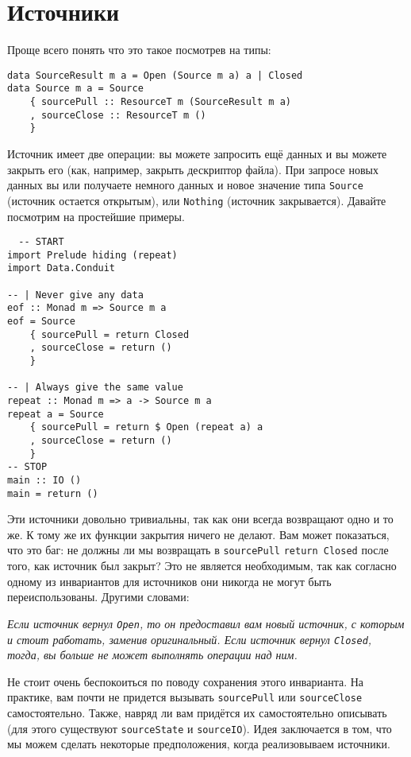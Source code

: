 \section{Источники}

Проще всего понять что это такое посмотрев на типы:
\begin{lstlisting}
data SourceResult m a = Open (Source m a) a | Closed
data Source m a = Source
    { sourcePull :: ResourceT m (SourceResult m a)
    , sourceClose :: ResourceT m ()
    }
\end{lstlisting}
Источник имеет две операции: вы можете запросить ещё данных и вы можете закрыть его (как,
например, закрыть дескриптор файла). При запросе новых данных вы или получаете немного
данных и новое  значение типа \lstinline=Source= (источник остается открытым), или
\lstinline=Nothing= (источник закрывается). Давайте посмотрим на простейшие примеры.
\begin{lstlisting}
  -- START
import Prelude hiding (repeat)
import Data.Conduit

-- | Never give any data
eof :: Monad m => Source m a
eof = Source
    { sourcePull = return Closed
    , sourceClose = return ()
    }

-- | Always give the same value
repeat :: Monad m => a -> Source m a
repeat a = Source
    { sourcePull = return $ Open (repeat a) a
    , sourceClose = return ()
    }
-- STOP
main :: IO ()
main = return ()
\end{lstlisting}
Эти источники довольно тривиальны, так как они всегда возвращают одно и то же. К тому
же их функции закрытия ничего не делают. Вам может показаться, что это баг: не должны ли 
мы возвращать в \lstinline=sourcePull= \verb=return Closed= после того, как источник был
закрыт? Это не является необходимым, так как согласно одному из инвариантов для
источников они никогда не могут быть переиспользованы. Другими словами:
    
\textit{Если источник вернул \lstinline=Open=, то он предоставил вам новый источник, с
которым и
стоит работать, заменив оригинальный. Если источник вернул \lstinline=Closed=, тогда, вы
больше не может выполнять операции над ним.}
    
Не стоит очень беспокоиться по поводу сохранения этого инварианта. На практике, вам почти
не придется вызывать \lstinline=sourcePull= или \lstinline=sourceClose= самостоятельно.
Также, навряд ли вам придётся их самостоятельно описывать (для этого существуют
\lstinline=sourceState= и \lstinline=sourceIO=).
Идея заключается в том, что мы можем сделать некоторые предположения, когда реализовываем
источники.

